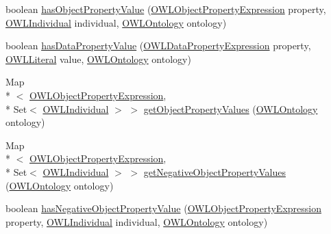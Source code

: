 \begin{DoxyCompactItemize}
\item 
boolean \hyperlink{classuk_1_1ac_1_1manchester_1_1cs_1_1owl_1_1owlapi_1_1_o_w_l_individual_impl_a08a2920896f32803626b5199139bb5b8}{has\-Object\-Property\-Value} (\hyperlink{interfaceorg_1_1semanticweb_1_1owlapi_1_1model_1_1_o_w_l_object_property_expression}{O\-W\-L\-Object\-Property\-Expression} property, \hyperlink{interfaceorg_1_1semanticweb_1_1owlapi_1_1model_1_1_o_w_l_individual}{O\-W\-L\-Individual} individual, \hyperlink{interfaceorg_1_1semanticweb_1_1owlapi_1_1model_1_1_o_w_l_ontology}{O\-W\-L\-Ontology} ontology)
\item 
boolean \hyperlink{classuk_1_1ac_1_1manchester_1_1cs_1_1owl_1_1owlapi_1_1_o_w_l_individual_impl_a1ad0731786fb863802c3fac7758409ec}{has\-Data\-Property\-Value} (\hyperlink{interfaceorg_1_1semanticweb_1_1owlapi_1_1model_1_1_o_w_l_data_property_expression}{O\-W\-L\-Data\-Property\-Expression} property, \hyperlink{interfaceorg_1_1semanticweb_1_1owlapi_1_1model_1_1_o_w_l_literal}{O\-W\-L\-Literal} value, \hyperlink{interfaceorg_1_1semanticweb_1_1owlapi_1_1model_1_1_o_w_l_ontology}{O\-W\-L\-Ontology} ontology)
\item 
Map\\*
$<$ \hyperlink{interfaceorg_1_1semanticweb_1_1owlapi_1_1model_1_1_o_w_l_object_property_expression}{O\-W\-L\-Object\-Property\-Expression}, \\*
Set$<$ \hyperlink{interfaceorg_1_1semanticweb_1_1owlapi_1_1model_1_1_o_w_l_individual}{O\-W\-L\-Individual} $>$ $>$ \hyperlink{classuk_1_1ac_1_1manchester_1_1cs_1_1owl_1_1owlapi_1_1_o_w_l_individual_impl_a2d6ec2b620f4a191826bd59ab740739a}{get\-Object\-Property\-Values} (\hyperlink{interfaceorg_1_1semanticweb_1_1owlapi_1_1model_1_1_o_w_l_ontology}{O\-W\-L\-Ontology} ontology)
\item 
Map\\*
$<$ \hyperlink{interfaceorg_1_1semanticweb_1_1owlapi_1_1model_1_1_o_w_l_object_property_expression}{O\-W\-L\-Object\-Property\-Expression}, \\*
Set$<$ \hyperlink{interfaceorg_1_1semanticweb_1_1owlapi_1_1model_1_1_o_w_l_individual}{O\-W\-L\-Individual} $>$ $>$ \hyperlink{classuk_1_1ac_1_1manchester_1_1cs_1_1owl_1_1owlapi_1_1_o_w_l_individual_impl_aed78c548a414ada009d2682cf9f8a178}{get\-Negative\-Object\-Property\-Values} (\hyperlink{interfaceorg_1_1semanticweb_1_1owlapi_1_1model_1_1_o_w_l_ontology}{O\-W\-L\-Ontology} ontology)
\item 
boolean \hyperlink{classuk_1_1ac_1_1manchester_1_1cs_1_1owl_1_1owlapi_1_1_o_w_l_individual_impl_a7a46e5f7e720dcd77a6b7e41b7102aea}{has\-Negative\-Object\-Property\-Value} (\hyperlink{interfaceorg_1_1semanticweb_1_1owlapi_1_1model_1_1_o_w_l_object_property_expression}{O\-W\-L\-Object\-Property\-Expression} property, \hyperlink{interfaceorg_1_1semanticweb_1_1owlapi_1_1model_1_1_o_w_l_individual}{O\-W\-L\-Individual} individual, \hyperlink{interfaceorg_1_1semanticweb_1_1owlapi_1_1model_1_1_o_w_l_ontology}{O\-W\-L\-Ontology} ontology)

\end{DoxyCompactItemize}
